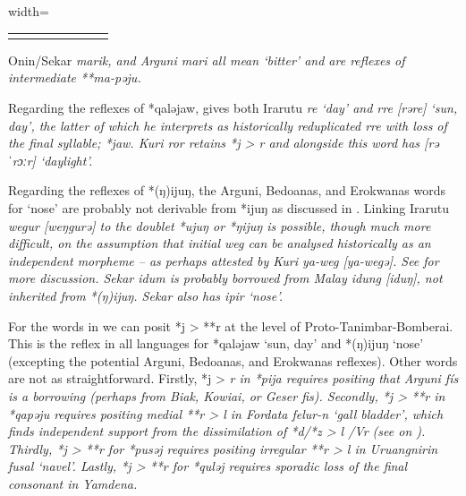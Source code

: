 \begin{table}
\begin{adjustbox}{width=\textwidth}
\begin{threeparttable}
\begin{tabular}{llllllll}
		\lspbottomrule
	\end{tabular}
		\begin{tablenotes}\tnsize
			\item[†]	{Onin/Sekar \it{marik}, and Arguni \it{mari}
								all mean ‘bitter’ and are reflexes
								of intermediate **ma-pəju.}
		\end{tablenotes}
	\end{threeparttable}
\end{adjustbox}
\end{table}

Regarding the reflexes of *qaləjaw,
\citet[272]{Jackson2014} gives both Irarutu \it{re} ‘day’
and \it{rre} [rəre] ‘sun,
day’, the latter of which he interprets as historically reduplicated
\it{r{\tl}re} with loss of the final syllable; *jaw.
Kuri \it{ror} retains *j > \it{r}
and alongside this word has [rəˈrɔːr] ‘daylight’.

Regarding the reflexes of *(ŋ)ijuŋ,
the Arguni, Bedoanas, and Erokwanas words for ‘nose’ are probably
not derivable from *ijuŋ as discussed in .
Linking Irarutu \it{wegur} [weŋgurə] to the doublet *ujuŋ or *ŋijuŋ
is possible, though much more difficult, on the assumption that initial \it{weg} can be analysed historically
as an independent morpheme -- as perhaps attested by Kuri \it{ya-weg} [ya-wegə].
See  for more discussion.
Sekar \it{idum} is probably borrowed from Malay \it{idung} [iduŋ],
not inherited from *(ŋ)ijuŋ. Sekar also has \it{ipir} ‘nose’.

For the words in  we can posit *j > **r at the level of Proto-Tanimbar-Bomberai.
This is the reflex in all languages for *qaləjaw ‘sun,
day’ and *(ŋ)ijuŋ ‘nose’ (excepting the potential Arguni,
Bedoanas, and Erokwanas reflexes).
Other words are not as straightforward.
Firstly, *j > \it{r} in *pija requires positing that Arguni \it{fís}
is a borrowing (perhaps from Biak,
Kowiai, or Geser \it{fis}).
Secondly, *j > **r in *qapəju requires positing medial **r >
\it{l} in Fordata \it{felur-n} ‘gall bladder’,
which finds independent support from the dissimilation of *d/*z
> \it{l} /{\gap}V\it{r} (see  on ).
Thirdly, *j > **r for *pusəj requires positing irregular **r
> \it{l} in Uruangnirin \it{fusal} ‘navel’.
Lastly, *j > **r for *quləj requires sporadic loss of the final consonant in Yamdena.

